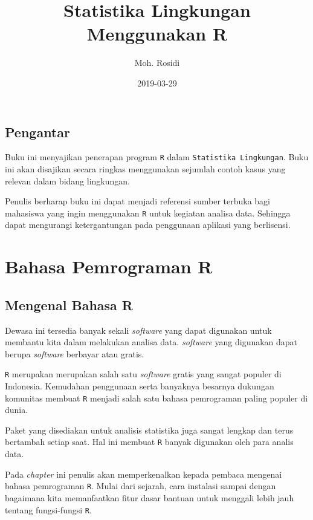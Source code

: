 \documentclass[]{book}
\title{Statistika Lingkungan Menggunakan R}
\author{Moh. Rosidi}
\date{2019-03-29}
\begin{document}
\maketitle

{
\hypersetup{linkcolor=black}
\setcounter{tocdepth}{1}
\tableofcontents
}
\listoftables
\listoffigures
\chapter*{Pengantar}\label{pengantar}

Buku ini menyajikan penerapan program \texttt{R} dalam
\texttt{Statistika\ Lingkungan}. Buku ini akan disajikan secara ringkas
menggunakan sejumlah contoh kasus yang relevan dalam bidang lingkungan.

Penulis berharap buku ini dapat menjadi referensi sumber terbuka bagi
mahasiswa yang ingin menggunakan \texttt{R} untuk kegiatan analisa data.
Sehingga dapat mengurangi ketergantungan pada penggunaan aplikasi yang
berlisensi.

\part*{Bahasa Pemrograman R}\label{part-bahasa-pemrograman-r}

\chapter{Mengenal Bahasa R}\label{mengenal-bahasa-r}

Dewasa ini tersedia banyak sekali \emph{software} yang dapat digunakan
untuk membantu kita dalam melakukan analisa data. \emph{software} yang
digunakan dapat berupa \emph{software} berbayar atau gratis.

\texttt{R} merupakan merupakan salah satu \emph{software} gratis yang
sangat populer di Indonesia. Kemudahan penggunaan serta banyaknya
besarnya dukungan komunitas membuat \texttt{R} menjadi salah satu bahasa
pemrograman paling populer di dunia.

Paket yang disediakan untuk analisis statistika juga sangat lengkap dan
terus bertambah setiap saat. Hal ini membuat \texttt{R} banyak digunakan
oleh para analis data.

Pada \emph{chapter} ini penulis akan memperkenalkan kepada pembaca
mengenai bahasa pemrograman \texttt{R}. Mulai dari sejarah, cara
instalasi sampai dengan bagaimana kita memanfaatkan fitur dasar bantuan
untuk menggali lebih jauh tentang fungsi-fungsi \texttt{R}.
\end{document}
